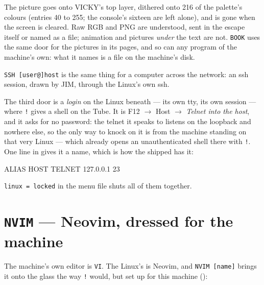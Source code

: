 \noindent The picture goes onto VICKY's top layer, dithered onto 216 of the
palette's colours (entries 40 to 255; the console's sixteen are left alone),
and is gone when the screen is cleared. Raw RGB and PNG are understood, sent
in the escape itself or named as a file; animation and pictures \emph{under}
the text are not. \verb|BOOK| uses the same door for the pictures in its
pages, and so can any program of the machine's own: what it names is a file
on the machine's disk.

\verb|SSH [user@]host| is the same thing for a computer across the
network: an ssh session, drawn by JIM, through the Linux's own ssh.

The third door is a \emph{login} on the Linux beneath --- its own tty,
its own session --- where \verb|!| gives a shell on the Tube. It is F12
$\rightarrow$ Host $\rightarrow$ \emph{Telnet into the host}, and it
asks for no password: the telnet it speaks to listens on the loopback and
nowhere else, so the only way to knock on it is from the machine standing
on that very Linux --- which already opens an unauthenticated shell there
with \verb|!|. One line in  gives it a name, which is
how the shipped  has it:

\begin{type}
ALIAS HOST TELNET 127.0.0.1 23
\end{type}

\noindent \verb|linux = locked| in the menu file shuts all of them
together.

\section{\texttt{NVIM} --- Neovim, dressed for the machine}
The machine's own editor is \verb|VI|. The Linux's is Neovim, and
\verb|NVIM [name]| brings it onto the glass the way \verb|!| would, but
set up for this machine ():

